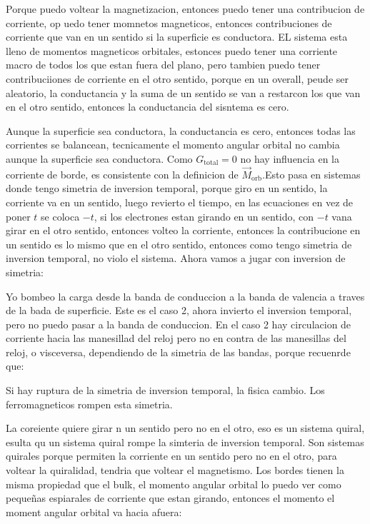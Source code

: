 \documentclass[11pt,fleqn]{book}
\begin{document}
Porque puedo voltear la magnetizacion, entonces puedo tener una contribucion de corriente, op uedo tener momnetos magneticos, entonces contribuciones de corriente que van en un sentido si la superficie es conductora. EL sistema esta lleno de momentos magneticos orbitales, estonces puedo tener una corriente macro de todos los que estan fuera del plano, pero tambien puedo tener contribuciiones de corriente en el otro sentido, porque en un overall, peude ser aleatorio, la conductancia y la suma de un sentido se van a restarcon los que van en el otro sentido, entonces la conductancia del sisntema es cero.

Aunque la superficie sea conductora, la conductancia es cero, entonces todas las corrientes se balancean, tecnicamente el momento angular orbital no cambia aunque la superficie sea conductora. Como $G_{\text{total}}=0$ no hay influencia en la corriente de borde, es consistente con la definicion de $\vec{M}_{\text{orb}}$.Esto pasa en sistemas donde tengo simetria de inversion temporal, porque giro en un sentido, la corriente va en un sentido, luego revierto el tiempo, en las ecuaciones en vez de poner $t$ se coloca $-t$, si los electrones estan girando en un sentido, con $-t$ vana girar en el otro sentido, entonces volteo la corriente, entonces la contribucione en un sentido es lo mismo que en el otro sentido, entonces como tengo simetria de inversion temporal, no violo el sistema. Ahora vamos a jugar con inversion de simetria:


Yo bombeo la carga desde la banda de conduccion a la banda de valencia a traves de la bada de superficie. Este es el caso 2, ahora invierto el inversion temporal, pero no puedo pasar a la banda de conduccion. En el caso 2 hay circulacion de corriente hacia las manesillad del reloj pero no en contra de las manesillas del reloj, o visceversa, dependiendo de la simetria de las bandas, porque recuenrde que:


Si hay ruptura de la simetria de inversion temporal, la fisica cambio. Los ferromagneticos rompen esta simetria.

La coreiente quiere girar n un sentido pero no en el otro, eso es un sistema quiral, esulta qu un sistema quiral rompe la simteria de inversion temporal. Son sistemas quirales porque permiten la corriente en un sentido pero no en el otro, para voltear la quiralidad, tendria que voltear el magnetismo. Los bordes tienen la misma propiedad que el bulk, el momento angular orbital lo puedo ver como pequeñas espiarales de corriente que estan girando, entonces el momento el moment angular orbital va hacia afuera:
\end{document}
